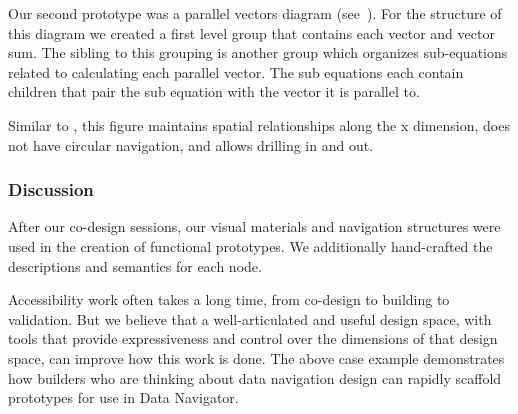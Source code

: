 \documentclass[12pt]{cmuthesis}
\begin{document}
Our second prototype was a parallel vectors diagram (see~). For the structure of this diagram we created a first level group that contains each vector and vector sum. The sibling to this grouping is another group which organizes sub-equations related to calculating each parallel vector. The sub equations each contain children that pair the sub equation with the vector it is parallel to.

Similar to , this figure maintains spatial relationships along the x dimension, does not have circular navigation, and allows drilling in and out.


\subsubsection{Discussion}
After our co-design sessions, our visual materials and navigation structures were used in the creation of functional prototypes. We additionally hand-crafted the descriptions and semantics for each node.

Accessibility work often takes a long time, from co-design to building to validation. But we believe that a well-articulated and useful design space, with tools that provide expressiveness and control over the dimensions of that design space, can improve how this work is done. The above case example demonstrates how builders who are thinking about data navigation design can rapidly scaffold prototypes for use in Data Navigator.
\end{document}
